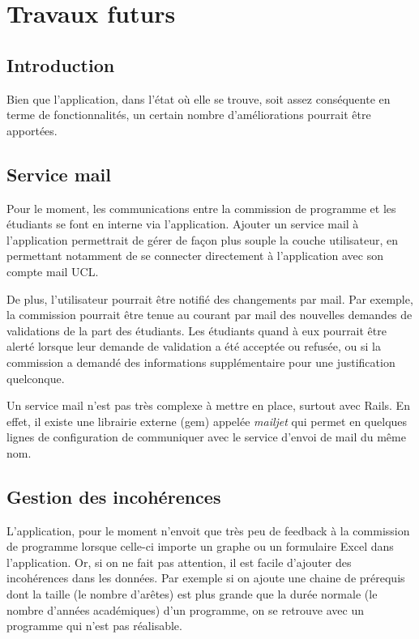 \chapter{Travaux futurs}
\label{futur_work}
\section{Introduction}
Bien que l’application, dans l'état où elle se trouve, soit assez conséquente en terme de fonctionnalités, un certain nombre d'améliorations pourrait être apportées. 

\section{Service mail}
Pour le moment, les communications entre la commission de programme et les étudiants se font en interne via l'application. Ajouter un service mail à l'application permettrait de gérer de façon plus souple la couche utilisateur, en permettant notamment de se connecter directement à l'application avec son compte mail UCL.

De plus, l'utilisateur pourrait être notifié des changements par mail. Par exemple, la commission pourrait être tenue au courant par mail des nouvelles demandes de validations de la part des étudiants. Les étudiants quand à eux pourrait être alerté lorsque leur demande de validation a été acceptée ou refusée, ou si la commission a demandé des informations supplémentaire pour une justification quelconque. 

Un service mail n'est pas très complexe à mettre en place, surtout avec Rails. En effet, il existe une librairie externe (gem) appelée \textit{mailjet} qui permet en quelques lignes de configuration de communiquer avec le service d'envoi de mail du même nom. 
\section{Gestion des incohérences}

L'application, pour le moment n'envoit que très peu de feedback à la commission de programme lorsque celle-ci importe un graphe ou un formulaire Excel dans l'application. Or, si on ne fait pas attention, il est facile d'ajouter des incohérences dans les données. Par exemple si on ajoute une chaine de prérequis dont la taille (le nombre d’arêtes) est plus grande que la durée normale (le nombre d'années académiques) d'un programme, on se retrouve avec un programme qui n'est pas réalisable.

